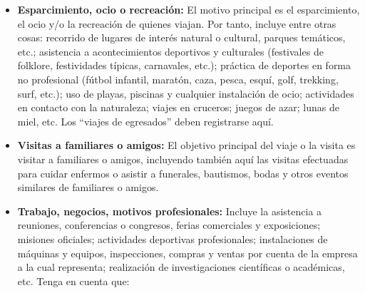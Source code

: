 \documentclass[
  openany]{book}
\begin{document}
\begin{itemize}
\item
  \textbf{Esparcimiento, ocio o recreación:} El motivo principal es el esparcimiento, el ocio y/o la recreación de quienes viajan. Por tanto, incluye entre otras cosas: recorrido de lugares de interés natural o cultural, parques temáticos, etc.; asistencia a acontecimientos deportivos y culturales (festivales de folklore, festividades típicas, carnavales, etc.); práctica de deportes en forma no profesional (fútbol infantil, maratón, caza, pesca, esquí, golf, trekking, surf, etc.); uso de playas, piscinas y cualquier instalación de ocio; actividades en contacto con la naturaleza; viajes en cruceros; juegos de azar; lunas de miel, etc. Los ``viajes de egresados'' deben registrarse aquí.
\item
  \textbf{Visitas a familiares o amigos:} El objetivo principal del viaje o la visita es visitar a familiares o amigos, incluyendo también aquí las visitas efectuadas para cuidar enfermos o asistir a funerales, bautismos, bodas y otros eventos similares de familiares o amigos.
\item
  \textbf{Trabajo, negocios, motivos profesionales:} Incluye la asistencia a reuniones, conferencias o congresos, ferias comerciales y exposiciones; misiones oficiales; actividades deportivas profesionales; instalaciones de máquinas y equipos, inspecciones, compras y ventas por cuenta de la empresa a la cual representa; realización de investigaciones científicas o académicas, etc. Tenga en cuenta que:


\end{itemize}
\end{document}
